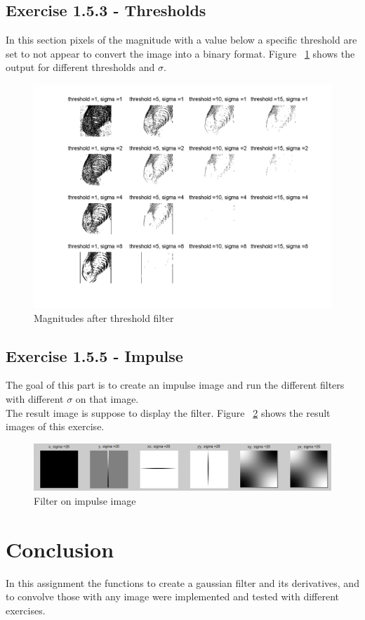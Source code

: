 \documentclass[11pt]{article}
\begin{document}
\subsection{Exercise 1.5.3 - Thresholds}
In this section pixels of the magnitude with a value below a specific threshold are set to not appear to convert the image into a binary format. Figure ~\ref{threshold} shows the output for different thresholds and $\sigma$.

\begin{figure}[h!]
\includegraphics[scale=0.6]{threshold.png}
\caption{Magnitudes after threshold filter}
\label{threshold}
\end{figure}

\subsection{Exercise 1.5.5 - Impulse}
The goal of this part is to create an impulse image and run the different filters with different $\sigma$ on that image.\\
The result image is suppose to display the filter. Figure ~\ref{impulse} shows the result images of this exercise.

\begin{figure}[h!]
\includegraphics[scale=0.4]{impulse.png}
\caption{Filter on impulse image}
\label{impulse}
\end{figure}

\section{Conclusion}
In this assignment the functions to create a gaussian filter and its derivatives, and to convolve those with any image were implemented and tested with different exercises. 
\end{document}
